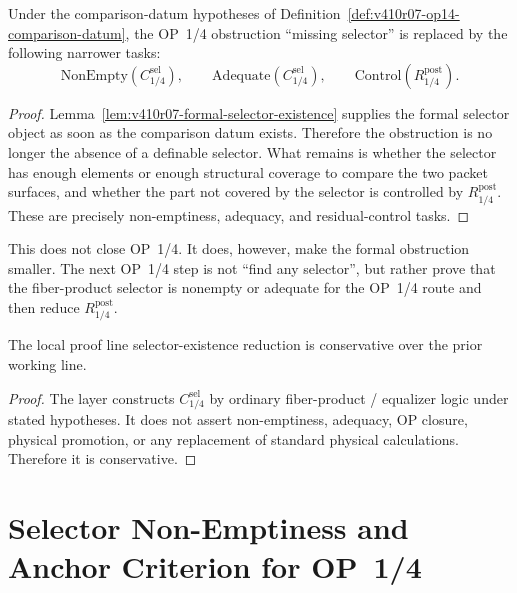 \begin{proposition}
\label{prop:v410r07-missing-selector-reduces-to-adequacy}
Under the comparison-datum hypotheses of
Definition~\ref{def:v410r07-op14-comparison-datum}, the OP~1/4 obstruction
``missing selector'' is replaced by the following narrower tasks:
\[
 \mathrm{NonEmpty}(C_{1/4}^{\mathrm{sel}}),
 \qquad
 \mathrm{Adequate}(C_{1/4}^{\mathrm{sel}}),
 \qquad
 \mathrm{Control}(R_{1/4}^{\mathrm{post}}).
\]
\end{proposition}

\begin{proof}
Lemma~\ref{lem:v410r07-formal-selector-existence} supplies the formal selector
object as soon as the comparison datum exists. Therefore the obstruction is no
longer the absence of a definable selector. What remains is whether the
selector has enough elements or enough structural coverage to compare the two
packet surfaces, and whether the part not covered by the selector is controlled
by \(R_{1/4}^{\mathrm{post}}\). These are precisely non-emptiness, adequacy,
and residual-control tasks.
\end{proof}

\begin{remark}
\label{rem:v410r07-op14-status}
This does not close OP~1/4. It does, however, make the formal obstruction
smaller. The next OP~1/4 step is not ``find any selector'', but rather prove
that the fiber-product selector is nonempty or adequate for the OP~1/4 route and
then reduce \(R_{1/4}^{\mathrm{post}}\).
\end{remark}

\begin{theorem}[conservativity]
\label{thm:v410r07-conservativity}
The local proof line selector-existence reduction is conservative over the prior
 working line.
\end{theorem}

\begin{proof}
The layer constructs \(C_{1/4}^{\mathrm{sel}}\) by ordinary fiber-product /
equalizer logic under stated hypotheses. It does not assert non-emptiness,
adequacy, OP closure, physical promotion, or any replacement of standard
physical calculations. Therefore it is conservative.
\end{proof}



\clearpage
\section{Selector Non-Emptiness and Anchor Criterion for OP~1/4}
\label{sec:v410r08-selector-nonempty-anchor-criterion}


